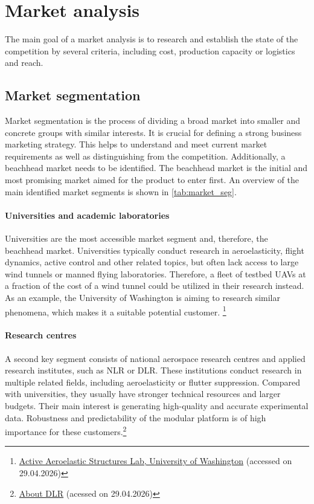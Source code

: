 \chapter{Market analysis}
The main goal of a market analysis is to research and establish the state of the competition by several criteria, including cost, production capacity or logistics and reach. 
\section{Market segmentation}
Market segmentation is the process of dividing a broad market into smaller and concrete groups with similar interests. \cite{Homburg} It is crucial for defining a strong business marketing strategy. This helps to understand and meet current market requirements as well as distinguishing from the competition. Additionally, a beachhead market needs to be identified. The beachhead market is the initial and most promising market aimed for the product to enter first. An overview of the main identified market segments is shown in \autoref{tab:market_seg}.
\subsubsection{Universities and academic laboratories}
Universities are the most accessible market segment and, therefore, the beachhead market. Universities typically conduct research in aeroelasticity, flight dynamics, active control and other related topics, but often lack access to large wind tunnels or manned flying laboratories. Therefore, a fleet of testbed UAVs at a fraction of the cost of a wind tunnel could be utilized in their research instead. As an example, the University of Washington is aiming to research similar phenomena, which makes it a suitable potential customer. \footnote{\href{https://sites.uw.edu/activeaeroelastic/research/}{Active Aeroelastic Structures Lab, University of Washington} (accessed on 29.04.2026)}

\subsubsection{Research centres}
A second key segment consists of national aerospace research centres and applied research institutes, such as NLR or DLR. These institutions conduct research in multiple related fields, including aeroelasticity or flutter suppression. Compared with universities, they usually have stronger technical resources and larger budgets. Their main interest is generating high-quality and accurate experimental data. Robustness and predictability of the modular platform is of high importance for these customers.\footnote{\href{https://www.dlr.de/en/dlr/about-us}{About DLR} (acessed on 29.04.2026)}

